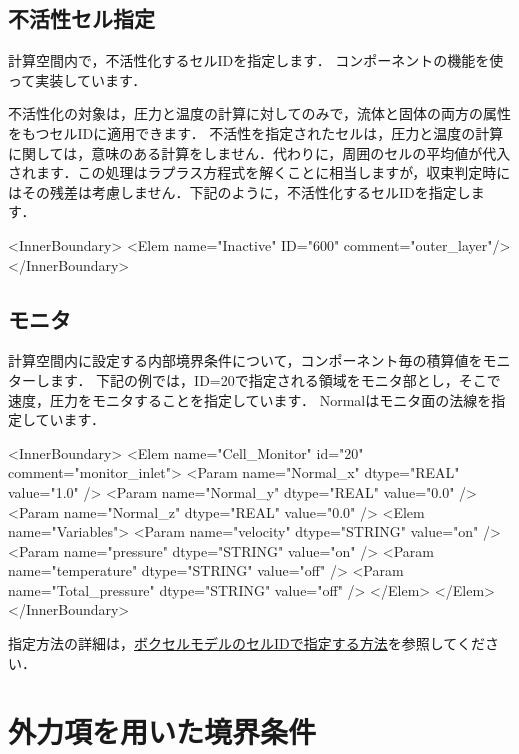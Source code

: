 \hypertarget{tgt:inactive}{\subsection{不活性セル指定}}

計算空間内で，不活性化するセルIDを指定します．
コンポーネントの機能を使って実装しています．
\vspace{2mm}

不活性化の対象は，圧力と温度の計算に対してのみで，流体と固体の両方の属性をもつセルIDに適用できます．
不活性を指定されたセルは，圧力と温度の計算に関しては，意味のある計算をしません．代わりに，周囲のセルの平均値が代入されます．この処理はラプラス方程式を解くことに相当しますが，収束判定時にはその残差は考慮しません．下記のように，不活性化するセルIDを指定します．

{\small
\begin{program}
<InnerBoundary>
  <Elem name="Inactive" ID="600" comment="outer_layer"/>
</InnerBoundary>
\end{program}
}


\hypertarget{tgt:inactive}{\subsection{モニタ}}

計算空間内に設定する内部境界条件について，コンポーネント毎の積算値をモニターします．
下記の例では，ID=20で指定される領域をモニタ部とし，そこで速度，圧力をモニタすることを指定しています．
Normalはモニタ面の法線を指定しています．

{\small
\begin{program}
<InnerBoundary>
  <Elem name="Cell_Monitor" id="20" comment="monitor_inlet"> 
    <Param name="Normal_x" dtype="REAL" value="1.0" /> 
    <Param name="Normal_y" dtype="REAL" value="0.0" /> 
    <Param name="Normal_z" dtype="REAL" value="0.0" /> 
    <Elem name="Variables"> 
      <Param name="velocity"       dtype="STRING" value="on" /> 
      <Param name="pressure"       dtype="STRING" value="on" /> 
      <Param name="temperature"    dtype="STRING" value="off" /> 
      <Param name="Total_pressure" dtype="STRING" value="off" /> 
    </Elem> 
  </Elem>
</InnerBoundary>
\end{program}
}

指定方法の詳細は，\hyperlink{tgt:cell_monitor}{ボクセルモデルのセルIDで指定する方法}を参照してください．


\hypertarget{tgt:external forcce}{\section{外力項を用いた境界条件}}


